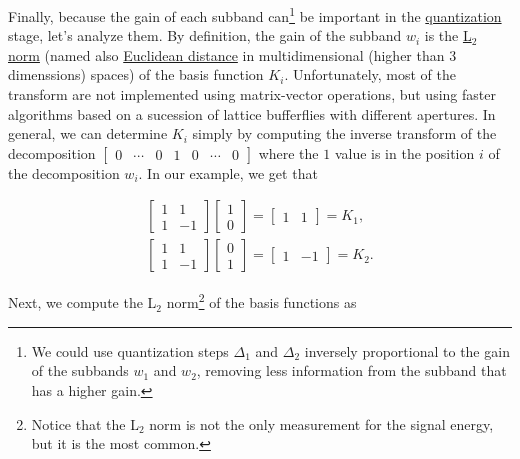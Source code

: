 Finally, because the gain of each subband can\footnote{We could use
quantization steps $\Delta_1$ and $\Delta_2$ inversely proportional to
the gain of the subbands $w_1$ and $w_2$, removing less information
from the subband that has a higher gain.} be important in the
\href{https://en.wikipedia.org/wiki/Quantization_(signal_processing)}{quantization}
stage, let's analyze them. By definition, the gain of the subband
$w_i$ is the \href{https://en.wikipedia.org/wiki/Lp_space}{L$_2$ norm}
(named also
\href{https://en.wikipedia.org/wiki/Euclidean_distance}{Euclidean
  distance} in multidimensional (higher than 3 dimenssions) spaces) of
the basis function $K_i$. Unfortunately, most of the transform are not
implemented using matrix-vector operations, but using faster
algorithms based on a sucession of lattice bufferflies with different
apertures. In general, we can determine $K_i$ simply by computing the
inverse transform of the decomposition $\begin{bmatrix} 0 & \cdots & 0
  & 1 & 0 & \cdots & 0 \end{bmatrix}$ where the $1$ value is in the
position $i$ of the decomposition $w_i$. In our example, we get that

\begin{equation}
  \begin{array}{l}
    \begin{bmatrix}
      1 & 1 \\
      1 & -1
    \end{bmatrix}
    \begin{bmatrix}
      1 \\
      0
    \end{bmatrix}
    =
    \begin{bmatrix}
      1 & 1
    \end{bmatrix} = K_1,
    \\
    \begin{bmatrix}
      1 & 1 \\
      1 & -1
    \end{bmatrix}
    \begin{bmatrix}
      0 \\
      1
    \end{bmatrix}
    =
    \begin{bmatrix}
      1 & -1
    \end{bmatrix} = K_2.
  \end{array}
\end{equation}

Next, we compute the L$_2$ norm\footnote{Notice that the L$_2$ norm is
not the only measurement for the signal energy, but it is the most
common.} of the basis functions as

